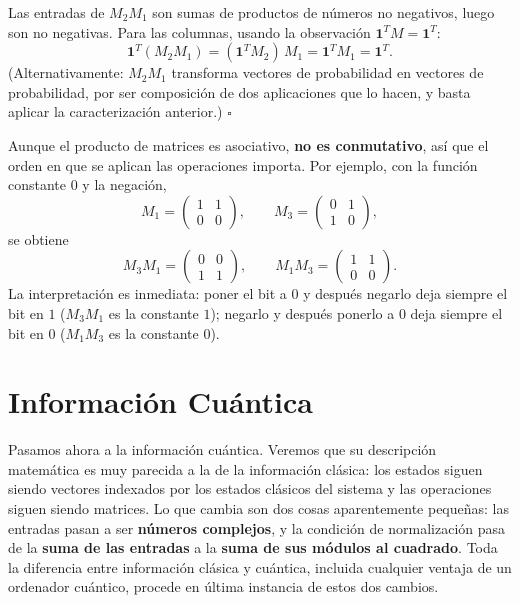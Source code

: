 \documentclass[11pt, a4paper, twoside, openright]{report}
\begin{document}
\begin{tcolorbox}[colback=gray!5!white,colframe=gray!75!black,title=\textbf{Demostración}]
Las entradas de $M_2 M_1$ son sumas de productos de números no negativos, luego son no negativas. Para las columnas, usando la observación $\mathbf{1}^T M = \mathbf{1}^T$:
\[ \mathbf{1}^T (M_2 M_1) = (\mathbf{1}^T M_2)\, M_1 = \mathbf{1}^T M_1 = \mathbf{1}^T. \]
(Alternativamente: $M_2 M_1$ transforma vectores de probabilidad en vectores de probabilidad, por ser composición de dos aplicaciones que lo hacen, y basta aplicar la caracterización anterior.) \hfill $\square$
\end{tcolorbox}

\noindent Aunque el producto de matrices es asociativo, \textbf{no es conmutativo}, así que el orden en que se aplican las operaciones importa. Por ejemplo, con la función constante $0$ y la negación,
\[
M_1 = \begin{pmatrix} 1 & 1 \\ 0 & 0 \end{pmatrix}, \qquad M_3 = \begin{pmatrix} 0 & 1 \\ 1 & 0 \end{pmatrix},
\]
se obtiene
\[
M_3 M_1 = \begin{pmatrix} 0 & 0 \\ 1 & 1 \end{pmatrix}, \qquad M_1 M_3 = \begin{pmatrix} 1 & 1 \\ 0 & 0 \end{pmatrix}.
\]
La interpretación es inmediata: poner el bit a $0$ y después negarlo deja siempre el bit en $1$ ($M_3 M_1$ es la constante $1$); negarlo y después ponerlo a $0$ deja siempre el bit en $0$ ($M_1 M_3$ es la constante $0$).

\cleardoublepage
\section{Información Cuántica}

\noindent Pasamos ahora a la información cuántica. Veremos que su descripción matemática es muy parecida a la de la información clásica: los estados siguen siendo vectores indexados por los estados clásicos del sistema y las operaciones siguen siendo matrices. Lo que cambia son dos cosas aparentemente pequeñas: las entradas pasan a ser \textbf{números complejos}, y la condición de normalización pasa de la \textbf{suma de las entradas} a la \textbf{suma de sus módulos al cuadrado}. Toda la diferencia entre información clásica y cuántica, incluida cualquier ventaja de un ordenador cuántico, procede en última instancia de estos dos cambios.
\end{document}
